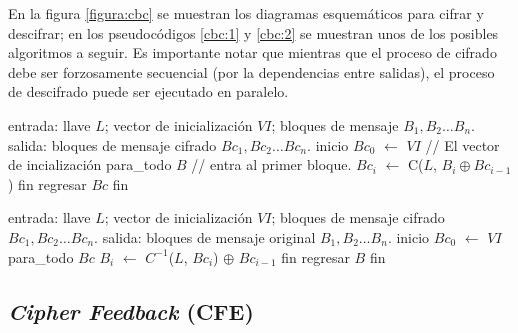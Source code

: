 En la figura \ref{figura:cbc} se muestran los diagramas esquemáticos para
cifrar y descifrar; en los pseudocódigos \ref{cbc:1} y \ref{cbc:2} se muestran
unos de los posibles algoritmos a seguir. Es importante notar que mientras que
el proceso de cifrado debe ser forzosamente secuencial (por la dependencias
entre salidas), el proceso de descifrado puede ser ejecutado en paralelo.

\vspace{0.5cm}

\begin{algoritmo}[caption={Modo de operación CBC, cifrado.}, label={cbc:1}]
  entrada: llave $ L $; vector de inicialización $ VI $;
           bloques de mensaje $ B_1, B_2 \dots B_n $.
   salida: bloques de mensaje cifrado $ Bc_1, Bc_2 \dots Bc_n $.
  inicio
    $Bc_0$ $\gets$ $ VI $                         // El vector de incialización
    para_todo $B$                 // entra al primer bloque.
      $Bc_i$ $\gets$ C($L$, $B_i \oplus Bc_{i - 1}$)
    fin
    regresar $Bc$
  fin
\end{algoritmo}

\begin{algoritmo}[caption={Modo de operación CBC, descifrado.}, label={cbc:2}]
  entrada: llave $ L $; vector de inicialización $ VI $;
           bloques de mensaje cifrado $ Bc_1, Bc_2 \dots Bc_n $.
   salida: bloques de mensaje original $ B_1, B_2 \dots B_n $.
  inicio
    $Bc_0$ $\gets$ $ VI $
    para_todo $Bc$
      $B_i$ $\gets$ $C^{-1}$($L$, $Bc_i$) $\oplus$ $Bc_{i-1}$
    fin
    regresar $B$
  fin
\end{algoritmo}

\subsection{\textit{Cipher Feedback} (CFE)}

